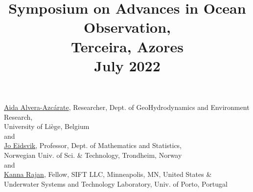 \documentclass[12pt,letterpaper]{article}
\title{Symposium on Advances in Ocean Observation,\\
  Terceira, Azores \\ \large{\textbf{July 2022}}}
\date{}
\begin{document}
\maketitle{}

\vspace{-1.75cm}
\begin{center}
   \href{http://modb.oce.ulg.ac.be/mediawiki/index.php/User:Aida}{\textsf{Aida Alvera-Azc\'{a}rate}},
  Researcher, Dept. of GeoHydrodynamics and Environment Research,\\
  University of Li\`{e}ge, Belgium\\
  and\\
  \href{https://www.ntnu.edu/employees/jo.eidsvik}{\textsf{Jo Eidsvik}},
  Professor, Dept. of Mathematics and Statistics, \\Norwegian Univ. of
  Sci. \& Technology, Trondheim, Norway\\
  and\\
  \href{https://kanna.rajan.systems}{\textsf{Kanna Rajan}},
  Fellow, SIFT LLC, Minneapolis, MN, United States \& \\Underwater Systems and Technology
  Laboratory, Univ. of Porto, Portugal\\
\end{center}





\newpage


\renewcommand{\thepage}{}
\end{document}
